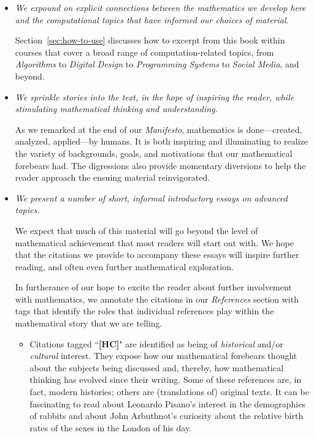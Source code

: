 \begin{itemize}
\item
{\em We expound on explicit connections between the mathematics we develop here and the computational topics that have informed our choices of material.}

\smallskip

Section~\ref{sec:how-to-use} discusses how to excerpt from this book within courses that cover a broad range of computation-related topics, from {\em Algorithms} to {\em Digital Design} to {\em Programming Systems} to {\em Social Media}, and beyond.

\item
{\em We sprinkle stories into the text, in the hope of inspiring the reader, while stimulating mathematical thinking and understanding.}

\smallskip

As we remarked at the end of our {\it Manifesto}, mathematics is done---created, analyzed, applied---by humans.  It is both inspiring and illuminating to realize the variety of backgrounds, goals, and motivations that our mathematical forebears had.  The digressions also provide momentary diversions to help the reader approach the ensuing material reinvigorated.

\item
{\em We present a number of short, informal introductory essays on advanced topics.}

\smallskip

We expect that much of this material will go beyond the level of mathematical achievement that most readers will start out with.  We hope that the citations we provide to accompany these essays will inspire further reading, and often even further mathematical exploration.

\smallskip

In furtherance of our hope to excite the reader about further involvement with mathematics, we annotate the citations in our {\it References} section with tags that identify the roles that individual references play within the mathematical story that we are telling.
  \begin{itemize}
  \item
Citations tagged ``{\bf [HC]}" are identified as being of {\em historical} and/or {\em cultural} interest.  They expose how our mathematical forebears thought about the subjects being discussed and, thereby, how mathematical thinking has evolved since their writing.  Some of these references are, in fact, modern histories; others are (translations of) original texts.  It can be fascinating to read about Leonardo Pisano's interest in the demographics of rabbits and about John Arbuthnot's curiosity about the relative birth rates of the sexes in the London of his day.


\end{itemize}
\end{itemize}
